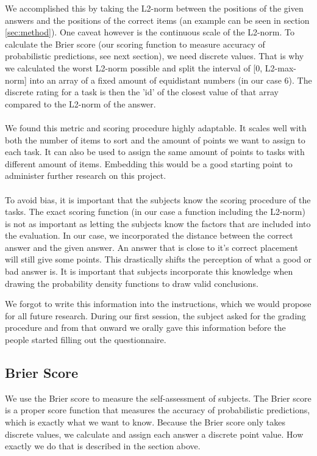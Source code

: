 \documentclass[../main/main.tex]{subfiles}
\begin{document}
	We accomplished this by taking the L2-norm between the positions of the given answers and the positions of the correct items (an example can be seen in section \ref{sec:method}).	One caveat however is the continuous scale of the L2-norm. To calculate the Brier score (our scoring function to measure accuracy of probabilistic predictions, see next section), we need discrete values. That is why we calculated the worst L2-norm possible and split the interval of [0, L2-max-norm] into an array of a fixed amount of equidistant numbers (in our case 6). The discrete rating for a task is then the 'id' of the closest value of that array compared to the L2-norm of the answer.
	\\\\
	We found this metric and scoring procedure highly adaptable. It scales well with both the number of items to sort and the amount of points we want to assign to each task. It can also be used to assign the same amount of points to tasks with different amount of items. Embedding this would be a good starting point to administer further research on this project.
	\\\\
	To avoid bias, it is important that the subjects know the scoring procedure of the tasks. The exact scoring function (in our case a function including the L2-norm) is not as important as letting the subjects know the factors that are included into the evaluation. In our case, we incorporated the distance between the correct answer and the given answer. An answer that is close to it's correct placement will still give some points. This drastically shifts the perception of what a good or bad answer is. It is important that subjects incorporate this knowledge when drawing the probability density functions to draw valid conclusions.
	
	We forgot to write this information into the instructions, which we would propose for all future research. During our first session, the subject asked for the grading procedure and from that onward we orally gave this information before the people started filling out the questionnaire.
	
	\subsection{Brier Score}
	\label{sec:brier_score}
	
	We use the Brier score to measure the self-assessment of subjects. The Brier score is a proper score function that measures the accuracy of probabilistic predictions, which is exactly what we want to know. Because the Brier score only takes discrete values, we calculate and assign each answer a discrete point value. How exactly we do that is described in the section above.
	
\end{document}
